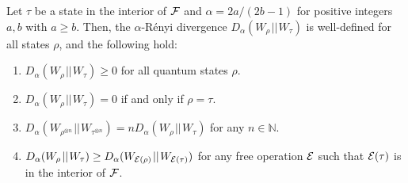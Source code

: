 \documentclass[pra,
aps,
twocolumn,
superscriptaddress,
groupedaddress,
nofootinbib,
reprint
]{revtex4-1}
\begin{document}
\begin{theorem}
	Let $\tau$ be a state in the interior of ${\mathcal F}$ and $\alpha = 2a / (2b-1)$ for positive integers $a,b$ with $a \geq b$.
Then, the $\alpha$-R\'{e}nyi divergence $D_\alpha(W_\rho \hspace{1pt}||\hspace{1pt} W_\tau)$ is well-defined for all states $\rho$, and the following hold:
\begin{enumerate}
\item $D_\alpha(W_\rho \hspace{1pt}||\hspace{1pt} W_\tau) \ge 0$ for all quantum states $\rho$.
\item  $D_\alpha(W_\rho \hspace{1pt}||\hspace{1pt} W_\tau) = 0$ if and only if $\rho =\tau$.
\item $D_\alpha(W_{\rho^{\otimes n}} \hspace{1pt}||\hspace{1pt} W_{\tau^{\otimes n}}) = n D_\alpha(W_\rho \hspace{1pt}||\hspace{1pt} W_\tau)$ for any $n \in \mathbb{N}$.
\item $D_\alpha(W_\rho \hspace{1pt}||\hspace{1pt} W_\tau) \geq D_\alpha (W_{{\mathcal E}(\rho)} \hspace{1pt}||\hspace{1pt} W_{{\mathcal E}(\tau)})$ for any free operation ${\mathcal E}$ such that ${\mathcal E}(\tau)$ is in the interior of ${\mathcal F}$.
\end{enumerate}
\end{theorem}
\addtocounter{theorem}{-1}
\endgroup
\end{document}
